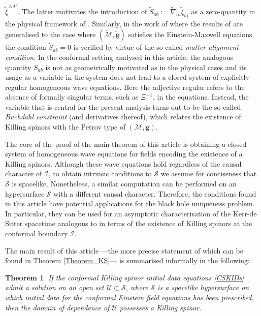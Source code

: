 \documentclass[10pt,a4paper]{article}
\theoremstyle{plain}
\newtheorem*{main}{Theorem}
\def\bmg{{\bm g}}
\begin{document}
$\tilde{\xi}^{AA'}$.  The latter motivates the introduction of
$\tilde{S}_{ab} := \tilde{\nabla}_{(a}\tilde{\xi}_{b)}$ as a
zero-quantity in the physical framework of \cite{GarVal08c}.  Similarly,
in the work of \cite{ValCol16} where the results of \cite{GarVal08c}
are generalised to the case where $(\tilde{\mathcal{M}},\tilde{\bmg})$
satisfies the Einstein-Maxwell equations, the condition
$\tilde{S}_{ab}=0$ is verified by virtue of the so-called \emph{matter
alignment condition}.  In the conformal setting analysed in this
article, the analogous quantity $S_{ab}$ is not as geometrically
motivated as in the physical cases and its usage as a variable in the
system does not lead to a closed system of explicitly regular
homogeneous wave equations. Here the adjective regular refers to the
absence of formally singular terms, such as $\Xi^{-1}$, in the
equations. Instead, the variable that is central for the present
analysis turns out to be the so-called \emph{Buchdahl constraint} (and
derivatives thereof), which relates the existence of Killing spinors
with the Petrov type of $(\mathcal{M},\bmg)$.


\medskip
   The core of the proof of the main theorem of this article is
   obtaining a closed system of homogeneous wave equations for fields
   encoding the existence of a Killing spinors. Although these wave
   equations hold regardless of the causal character of $\mathscr{I}$,
   to obtain intrinsic conditions to $\mathcal{S}$ we assume for conciseness
   that $\mathcal{S}$ is spacelike.  Nonetheless, a similar
   computation can be performed on an hypersurface $\mathcal{S}$ with
   a different causal character. Therefore, the conditions found in this article
   have potential applications for the black hole uniqueness problem.
   In particular, they can be used for an asymptotic characterisation
   of the Kerr-de Sitter spacetime analogous to \cite{MarPaeSenSim16}
   in terms of the existence of Killing spinors at the conformal
   boundary $\mathscr{I}$.

\medskip

The main result of this article ---the more precise statement of which
can be found in Theorem \ref{Theorem_KS}--- is summarised informally
in the following:

\begin{main}\label{TheoremSummary}
If the \emph{conformal Killing spinor initial data equations}
\eqref{CSKIDs} admit a solution on an open set $\mathcal{U}\subset
\mathcal{S}$, where $\mathcal{S}$ is a spacelike hypersurface on which
initial data for the conformal Einstein field equations has been
prescribed, then the domain of dependence of $\mathcal{U}$ possesses a
Killing spinor.
\end{main}
\end{document}
